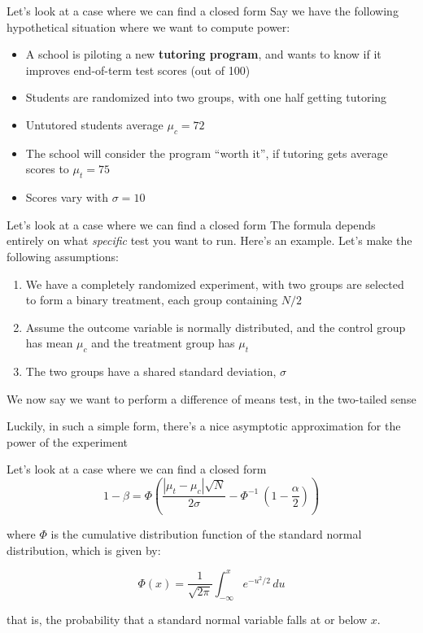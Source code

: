 \documentclass[
  ignorenonframetext,
  aspectratio=169,
]{beamer}
\providecommand{\tightlist}{%
  \setlength{\itemsep}{0pt}\setlength{\parskip}{0pt}}\usepackage{longtable,booktabs,array}
\begin{document}
\begin{frame}{Let's look at a case where we can find a closed form}
\label{lets-look-at-a-case-where-we-can-find-a-closed-form-1}
Say we have the following hypothetical situation where we want to
compute power:

\begin{itemize}
\tightlist
\item
  A school is piloting a new \textbf{tutoring program}, and wants to
  know if it improves end-of-term test scores (out of 100)
\item
  Students are randomized into two groups, with one half getting
  tutoring
\item
  Untutored students average \(\mu_c = 72\)
\item
  The school will consider the program ``worth it'', if tutoring gets
  average scores to \(\mu_t = 75\)
\item
  Scores vary with \(\sigma = 10\)
\end{itemize}
\end{frame}

\begin{frame}{Let's look at a case where we can find a closed form}
\label{lets-look-at-a-case-where-we-can-find-a-closed-form-2}
The formula depends entirely on what \emph{specific} test you want to
run. Here's an example. Let's make the following assumptions:

\begin{enumerate}
\tightlist
\item
  We have a completely randomized experiment, with two groups are
  selected to form a binary treatment, each group containing \(N / 2\)
\item
  Assume the outcome variable is normally distributed, and the control
  group has mean \(\mu_c\) and the treatment group has \(\mu_t\)
\item
  The two groups have a shared standard deviation, \(\sigma\)
\end{enumerate}

We now say we want to perform a difference of means test, in the
two-tailed sense

\begin{center}
Luckily, in such a simple form, there's a nice asymptotic approximation for the power of the experiment
\end{center}
\end{frame}

\begin{frame}{Let's look at a case where we can find a closed form}
\label{lets-look-at-a-case-where-we-can-find-a-closed-form-3}
\[
1 - \beta = \Phi \left( \frac{ | \mu_t - \mu_c | \sqrt{N}}{2\sigma} - \Phi^{-1}\ \left(1-\frac{\alpha}{2}\right) \right)
\]

where \(\Phi\) is the cumulative distribution function of the standard
normal distribution, which is given by:

\[
\Phi(x) = \frac{1}{\sqrt{2\pi}} \int_{-\infty}^{x} e^{-u^2/2} \, du
\]

that is, the probability that a standard normal variable falls at or
below \(x\).
\end{frame}
\end{document}
